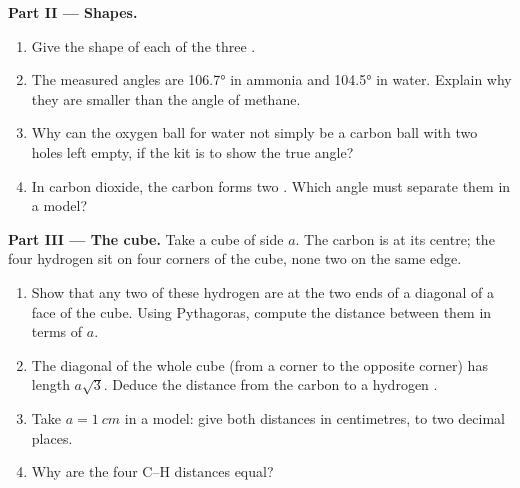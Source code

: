 \begin{problem}
\medskip
\noindent\textbf{Part II --- Shapes.}
\begin{enumerate}[resume]
  \item Give the shape of each of the three .
  \item The measured angles are \ang{106.7} in ammonia and \ang{104.5} in
        water. Explain why they are smaller than the angle of methane.
  \item Why can the oxygen ball for water not simply be a carbon ball with
        two holes left empty, if the kit is to show the true angle?
  \item In carbon dioxide, the carbon  forms two . Which
        angle must separate them in a model?
\end{enumerate}

\medskip
\noindent\textbf{Part III --- The cube.}
Take a cube of side $a$. The carbon  is at its centre; the four
hydrogen  sit on four corners of the cube, none two on the same edge.
\begin{enumerate}[resume]
  \item Show that any two of these hydrogen  are at the two ends of
        a diagonal of a face of the cube. Using Pythagoras, compute the
        distance between them in terms of $a$.
  \item The diagonal of the whole cube (from a corner to the opposite
        corner) has length $a\sqrt{3}$. Deduce the distance from the
        carbon  to a hydrogen .
  \item Take $a = \qty{1}{cm}$ in a model: give both distances in
        centimetres, to two decimal places.
  \item Why are the four C--H distances equal?
\end{enumerate}


\end{problem}
